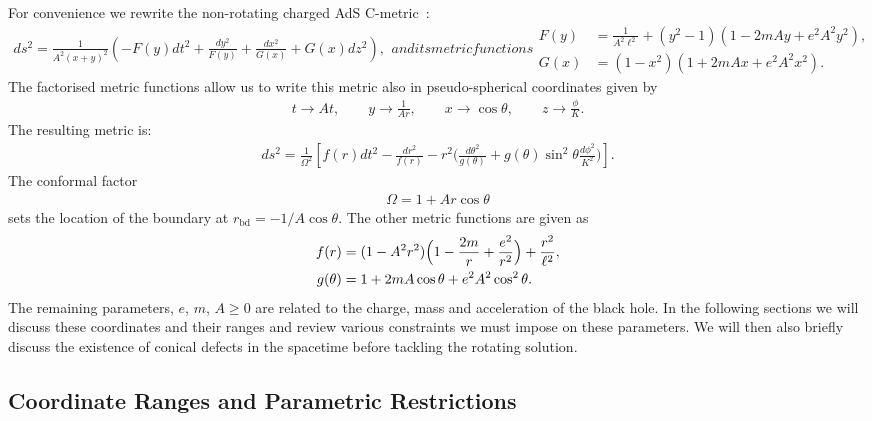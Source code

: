 \documentclass[
twoside,
openright,
frontopenright,
]{dmathesis}
\newcommand{\nn}{\nonumber}
\newcommand{\bd}{\mathrm{bd}}
\begin{document}
For convenience we rewrite the non-rotating charged AdS
C-metric~\cite{Hong:2003gx,Hong:2004dm}:
\begin{subequations}
  \label{eq:NRyx}
  \begin{align}
    \label{eq:NRyx-metric}
    ds^2 = \frac{1}{A^2(x+y)^2} \left(-F(y)dt^2 + \frac{dy^2}{F(y)} +
    \frac{dx^2}{G(x)} + G(x) dz^2\right),
  \end{align}
  and its metric functions
  \begin{align}
    \label{eq:NRyx-fn}
    F(y)&=\frac{1}{A^2 \ell^2} + (y^2 - 1)(1-2mAy+e^2A^2y^2),\nn\\
    G(x)&=(1-x^2)(1+2mAx+e^2A^2x^2).
  \end{align}
\end{subequations}
The factorised metric functions allow us to write this metric also in
pseudo-spherical coordinates given by
\begin{gather}
  t \to At, \qquad y \to \frac{1}{Ar}, \qquad x \to \cos\theta, \qquad z \to
  \frac{\phi}{K}.
\end{gather}
The resulting metric is:
\begin{align}
\label{eq:NRrth-metric}
ds^2=\frac{1}{\Omega^2}\left[ 
f(r) dt^2
-\frac{dr^2}{f(r)} - r^2 \Big( \frac{d\theta^2}{g(\theta)} 
+ g(\theta)\sin^2\theta \frac{d\phi^2}{K^2}\Big)\right].
\end{align}
The conformal factor
\begin{align}\label{eq:conf}
\Omega=1+Ar\cos\theta
\end{align}
sets the location of the boundary at $r_\bd=-1/A\cos\theta$. The other metric
functions are given as
\begin{align}
f(r)&=(1-A^2r^2)\Bigl(1-\frac{2 m}{r}+\frac{e^2}{r^2}\Bigr)
+\frac{r^2}{\ell^2},\nn\\
g(\theta)&=1+2mA \cos\theta+ e^2A^2 \cos^2\theta.
\label{eq:NRrth-metric}
\end{align}
The remaining parameters, $e$, $m$, $A\geqslant 0$ are related to the charge,
mass and acceleration of the black hole. In the following sections we will
discuss these coordinates and their ranges and review various constraints we
must impose on these parameters. We will then also briefly discuss the existence
of conical defects in the spacetime before tackling the rotating solution.

\subsection{Coordinate Ranges and Parametric Restrictions}
\label{sec:parameters}
\end{document}

